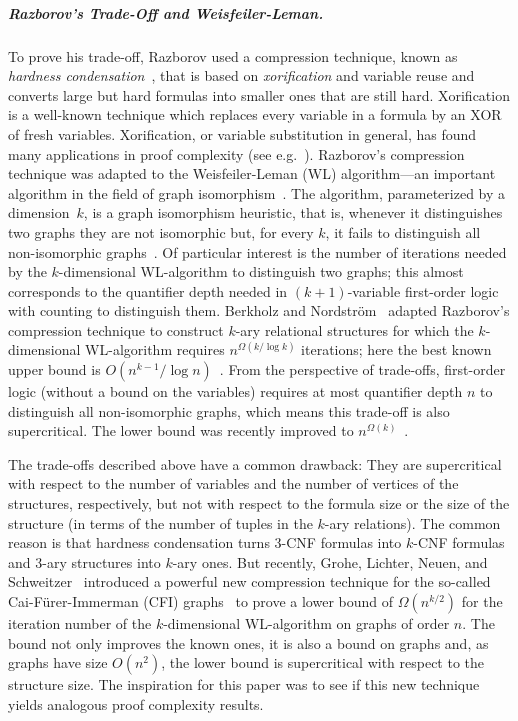 \documentclass[a4paper,english, thm-restate]{lipics-v2021}
\begin{document}
\subparagraph*{Razborov's Trade-Off and Weisfeiler-Leman.}

To prove his trade-off, Razborov used a compression technique, known as \emph{hardness condensation}~\cite{DBLP:journals/jacm/Razborov16, BerkholzNordstrom16}, that is based on \emph{xorification} and variable reuse
and converts large but hard formulas into smaller ones that are still hard.
Xorification is a well-known technique which replaces every variable in a formula by an XOR of fresh variables.
Xorification, or variable substitution in general, has found many applications in proof complexity 
%
(see e.g.~\cite{DBLP:conf/stoc/Ben-SassonW99,Ben-SassonNordstrom2008, BenSassonNordstrom2011,BeckNT2013}).
Razborov's compression technique was adapted to the Weisfeiler-Leman (WL) algorithm---an
important algorithm in the field of graph isomorphism~\cite{Grohe2012, Babai2016, GroheNeuen2024}.
The algorithm, parameterized by a dimension~$k$, is a graph isomorphism
heuristic, that is, whenever it distinguishes two graphs they are not isomorphic
but, for every $k$, it fails to distinguish all non-isomorphic graphs~\cite{CaiFuererImmerman1992}.
Of particular interest is the number of iterations needed by the $k$-dimensional WL-algorithm to distinguish two graphs; this 
almost corresponds to the quantifier depth needed in $(k+1)$-variable first-order logic with counting to distinguish them.
Berkholz and Nordström~\cite{BerkholzNordstrom16}
adapted Razborov's compression technique
to construct $k$-ary relational structures
for which the $k$-dimensional WL-algorithm requires
$n^{\Omega(k/\log k)}$ iterations; here the best known upper bound is $O(n^{k-1}/\log n)$~\cite{GroheLN23}.
From the perspective of trade-offs, 
first-order logic (without a bound on the variables)
requires at most quantifier depth $n$ to distinguish all non-isomorphic graphs, which means this trade-off is also supercritical.
The lower bound was recently improved to $n^{\Omega(k)}$~\cite{GroheLN23}.

The trade-offs described above have a common drawback:
They are supercritical with respect to the number of variables and the number of vertices of the structures, respectively,
but not with respect to the formula size or the size of the structure (in terms of the number of tuples in the $k$-ary relations). The common reason is that hardness condensation turns $3$-CNF formulas into $k$-CNF formulas and $3$-ary structures into $k$-ary ones.
But recently,  Grohe, Lichter, Neuen, and Schweitzer~\cite{DBLP:conf/focs/GroheLNS23} introduced a powerful new compression technique for the so-called Cai-Fürer-Immerman (CFI) graphs~\cite{CaiFuererImmerman1992} to prove a lower bound of $\Omega(n^{k/2})$
for the iteration number of the $k$-dimensional WL-algorithm on graphs of order $n$.
%
%
%
%
%
The bound not only improves the known ones, it is also a
%
bound
on graphs
%
%
%
%
and, as graphs have size $O(n^2)$, the lower bound is supercritical with
respect to the structure size. 
The inspiration for this paper was to see if this new technique yields analogous proof complexity results. 
\end{document}
